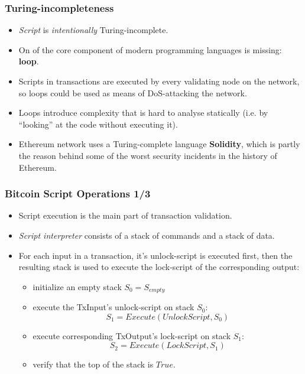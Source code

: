 \documentclass{beamer}
\begin{document}
\begin{frame}[fragile]
  \frametitle{Turing-incompleteness}
  \begin{itemize}
  \item \textit{Script} is \textit{intentionally} Turing-incomplete.
  \item On of the core component of modern programming languages is missing:
    \textbf{loop}.
  \item Scripts in transactions are executed by every validating node on the
    network, so loops could be used as means of DoS-attacking the network.
  \item Loops introduce complexity that is hard to analyse statically (i.e. by
    ``looking'' at the code without executing it).
  \item Ethereum network uses a Turing-complete language \textbf{Solidity},
    which is partly the reason behind some of the worst security incidents in
    the history of Ethereum.
  \end{itemize}
\end{frame}

\begin{frame}[fragile]
  \frametitle{Bitcoin Script Operations 1/3}
  \begin{itemize}
  \item Script execution is the main part of transaction validation.
  \item \textit{Script interpreter} consists of a stack of commands and a stack
    of data.
  \item For each input in a transaction, it's unlock-script is executed first,
    then the resulting stack is used to execute the lock-script of the
    corresponding output:
    \begin{itemize}
    \item initialize an empty stack $S_0 = S_{empty}$
    \item execute the TxInput's unlock-script on stack $S_0$:
      $$S_1 = Execute(UnlockScript, S_0)$$
    \item execute corresponding TxOutput's lock-script on stack $S_1$:
      $$S_2 = Execute(LockScript, S_1)$$
    \item verify that the top of the stack is $True$.
    \end{itemize}
  \end{itemize}
\end{frame}
\end{document}
